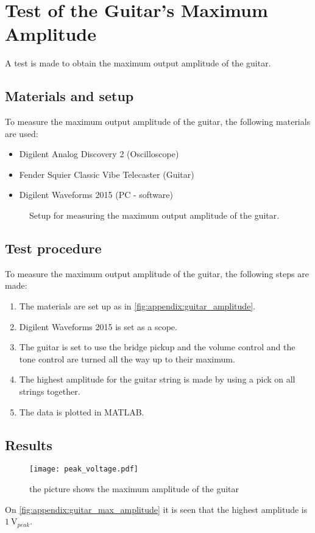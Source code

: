 \chapter{Test of the Guitar's Maximum Amplitude}\label{app:guitar_max_amplitude}

A test is made to obtain the maximum output amplitude of the guitar.

\section*{Materials and setup}
To measure the maximum output amplitude of the guitar, the following materials are used:
\begin{itemize}
\item Digilent Analog Discovery 2 (Oscilloscope)
\item Fender Squier Classic Vibe Telecaster (Guitar)
\item Digilent Waveforms 2015 (PC - software)
\end{itemize}

\begin{figure}[htbp!]
\centering
\def\svgwidth{\columnwidth}

\caption{Setup for measuring the maximum output amplitude of the guitar.}
		\label{fig:appendix:guitar_amplitude}
\end{figure}

\section*{Test procedure}
To measure the maximum output amplitude of the guitar, the following steps are made:
\begin{enumerate}
\item The materials are set up as in \autoref{fig:appendix:guitar_amplitude}.
\item Digilent Waveforms 2015 is set as a scope. 
\item The guitar is set to use the bridge pickup and the volume control and the tone control are turned all the way up to their maximum.
\item The highest amplitude for the guitar string is made by using a pick on all strings together.
\item The data is plotted in MATLAB.
\end{enumerate}

\section*{Results}

\begin{figure}[htbp!]
	\centering
		\texttt{[image: peak\_voltage.pdf]}
		\caption{the picture shows the maximum amplitude of the guitar}
		\label{fig:appendix:guitar_max_amplitude}
\end{figure}

On  \autoref{fig:appendix:guitar_max_amplitude} it is seen that the highest amplitude is $\SI{1}{\volt}_{peak}$.
